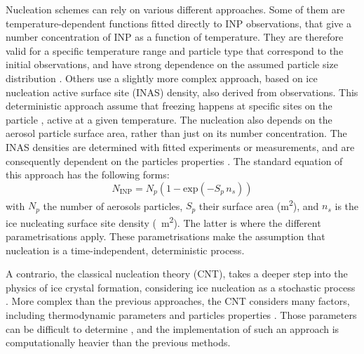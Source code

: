     Nucleation schemes can rely on various different approaches. Some of them are temperature-dependent functions fitted directly to INP observations, that give a number concentration of INP as a function of temperature. They are therefore valid for a specific temperature range and particle type that correspond to the initial observations, and have strong dependence on the assumed particle size distribution \citep[e.g.][]{demott_predicting_2010, demott_integrating_2015, wilson_marine_2015, li_predicting_2022}.
    Others use a slightly more complex approach, based on ice nucleation active surface site (INAS) density, also derived from observations. This deterministic approach assume that freezing happens at specific sites on the particle \citep{fletcher_active_1969, vali_quantitative_1971}, active at a given temperature. The nucleation also depends on the aerosol particle surface area, rather than just on its number concentration. The INAS densities are determined with fitted experiments or measurements, and are consequently dependent on the particles properties \citep[e.g.][]{connolly_studies_2009, murray_ice_2012, niemand_particle-surface-area-based_2012, ullrich_new_2017, hummel_simulating_2018, mccluskey_marine_2018}.
    The standard equation of this approach has the following forms:
    \begin{equation}
        N_{\text{INP}} = N_{p} \left( 1 - \text{exp}(-S_{p}\, n_s)\right)
        \label{eq:Ninp_inas}
    \end{equation}
    with $N_p$ the number of aerosols particles, $S_p$ their surface area (\si{\square\meter}), and $n_s$ is the ice nucleating surface site density (\si{\per\square\meter}). The latter is where the different parametrisations apply.
    These parametrisations make the assumption that nucleation is a time-independent, deterministic process. 
    
    A contrario, the classical nucleation theory (CNT), takes a deeper step into the physics of ice crystal formation, considering ice nucleation as a stochastic process \citep{pruppacher_microphysics_1998, ickes_classical_2015}.
    More complex than the previous approaches, the CNT considers many factors, including thermodynamic parameters and particles properties \citep{keita_new_2020}. Those parameters can be difficult to determine \citep[e.g.][]{chen_parameterizing_2008, barahona_ice_2012, hoose_heterogeneous_2012, savre_theory-based_2015}, and the implementation of such an approach is computationally heavier than the previous methods.
    
